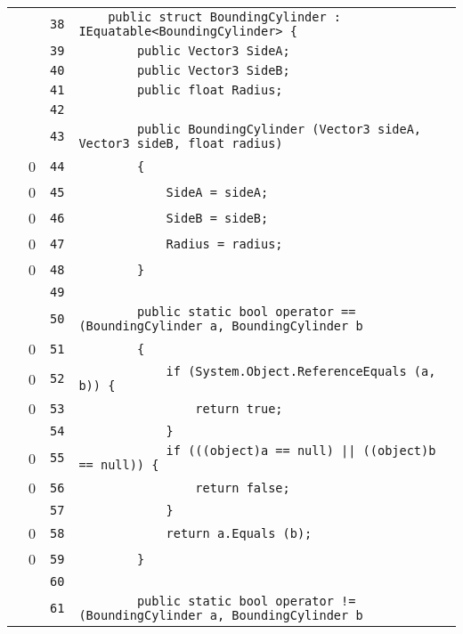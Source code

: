 \documentclass[a4paper,10pt]{article}
\begin{document}
\begin{longtable}[l]{lrrl}
\cellcolor{gray} &  & \verb~38~ & \verb~    public struct BoundingCylinder : IEquatable<BoundingCylinder> {~\\
\cellcolor{gray} &  & \verb~39~ & \verb~        public Vector3 SideA;~\\
\cellcolor{gray} &  & \verb~40~ & \verb~        public Vector3 SideB;~\\
\cellcolor{gray} &  & \verb~41~ & \verb~        public float Radius;~\\
\cellcolor{gray} &  & \verb~42~ & \verb~~\\
\cellcolor{gray} &  & \verb~43~ & \verb~        public BoundingCylinder (Vector3 sideA, Vector3 sideB, float radius)~\\
\cellcolor{red} & 0 & \verb~44~ & \verb~        {~\\
\cellcolor{red} & 0 & \verb~45~ & \verb~            SideA = sideA;~\\
\cellcolor{red} & 0 & \verb~46~ & \verb~            SideB = sideB;~\\
\cellcolor{red} & 0 & \verb~47~ & \verb~            Radius = radius;~\\
\cellcolor{red} & 0 & \verb~48~ & \verb~        }~\\
\cellcolor{gray} &  & \verb~49~ & \verb~~\\
\cellcolor{gray} &  & \verb~50~ & \verb~        public static bool operator == (BoundingCylinder a, BoundingCylinder b~\\
\cellcolor{red} & 0 & \verb~51~ & \verb~        {~\\
\cellcolor{red} & 0 & \verb~52~ & \verb~            if (System.Object.ReferenceEquals (a, b)) {~\\
\cellcolor{red} & 0 & \verb~53~ & \verb~                return true;~\\
\cellcolor{gray} &  & \verb~54~ & \verb~            }~\\
\cellcolor{red} & 0 & \verb~55~ & \verb~            if (((object)a == null) || ((object)b == null)) {~\\
\cellcolor{red} & 0 & \verb~56~ & \verb~                return false;~\\
\cellcolor{gray} &  & \verb~57~ & \verb~            }~\\
\cellcolor{red} & 0 & \verb~58~ & \verb~            return a.Equals (b);~\\
\cellcolor{red} & 0 & \verb~59~ & \verb~        }~\\
\cellcolor{gray} &  & \verb~60~ & \verb~~\\
\cellcolor{gray} &  & \verb~61~ & \verb~        public static bool operator != (BoundingCylinder a, BoundingCylinder b~\\

\end{longtable}
\end{document}
